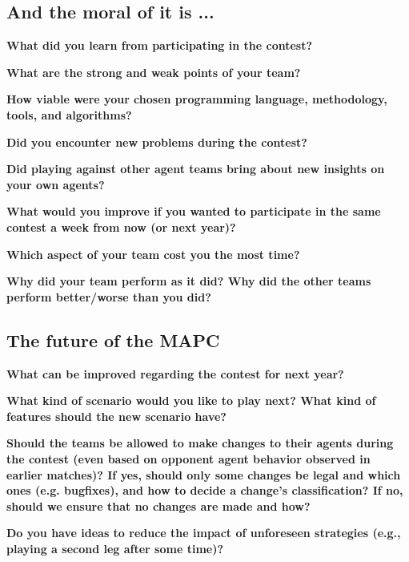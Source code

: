 \documentclass{llncs}
\begin{document}
\subsection{And the moral of it is ...}

\begin{description}
  \item \textbf{What did you learn from participating in the contest?}
  \item \textbf{What are the strong and weak points of your team?}
  \item \textbf{How viable were your chosen programming language, methodology, tools, and algorithms?}
  \item \textbf{Did you encounter new problems during the contest?}
  \item \textbf{Did playing against other agent teams bring about new insights on your own agents?}
  \item \textbf{What would you improve if you wanted to participate in the same contest a week from now (or next year)?}
  \item \textbf{Which aspect of your team cost you the most time?}
  \item \textbf{Why did your team perform as it did? Why did the other teams perform better/worse than you did?}
\end{description}

\subsection{The future of the MAPC}

\begin{description}
  \item \textbf{What can be improved regarding the contest for next year?}
  \item \textbf{What kind of scenario would you like to play next? What kind of features should the new scenario have?}
  \item \textbf{Should the teams be allowed to make changes to their agents during the contest (even based on opponent agent behavior observed in earlier matches)? If yes, should only some changes be legal and which ones (e.g. bugfixes), and how to decide a change’s classification? If no, should we ensure that no changes are made and how?}
  \item \textbf{Do you have ideas to reduce the impact of unforeseen strategies (e.g., playing a second leg after some time)?}
\end{description}
\end{document}
